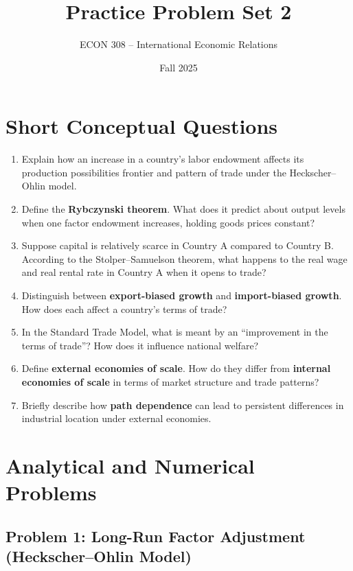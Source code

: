 \documentclass[12pt]{article}
\title{Practice Problem Set 2}
\author{ECON 308 -- International Economic Relations}
\date{Fall 2025}
\begin{document}
\maketitle

\section*{Short Conceptual Questions}

\begin{enumerate}
\item Explain how an increase in a country’s labor endowment affects its production possibilities frontier and pattern of trade under the Heckscher–Ohlin model.

\item Define the \textbf{Rybczynski theorem}. What does it predict about output levels when one factor endowment increases, holding goods prices constant?

\item Suppose capital is relatively scarce in Country A compared to Country B. According to the Stolper–Samuelson theorem, what happens to the real wage and real rental rate in Country A when it opens to trade?

\item Distinguish between \textbf{export-biased growth} and \textbf{import-biased growth}. How does each affect a country’s terms of trade?

\item In the Standard Trade Model, what is meant by an “improvement in the terms of trade”? How does it influence national welfare?

\item Define \textbf{external economies of scale}. How do they differ from \textbf{internal economies of scale} in terms of market structure and trade patterns?

\item Briefly describe how \textbf{path dependence} can lead to persistent differences in industrial location under external economies.
\end{enumerate}

\newpage

\section*{Analytical and Numerical Problems}

\subsection*{Problem 1: Long-Run Factor Adjustment (Heckscher–Ohlin Model) }
\end{document}
